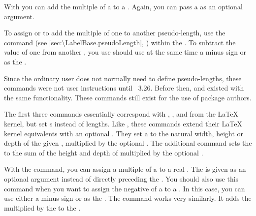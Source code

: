 With  you can add the multiple of a  to a
. Again, you can pass a  as an optional
argument.

To assign or to add the multiple of one  to another
pseudo-length, use the  command (see
\autoref{sec:\LabelBase.pseudoLength}, )
within the . To subtract the value of one 
from another , you use should use at the same time a
minus sign or  as the .

%
%
Since the ordinary user does not normally need to define pseudo-lengths, these
commands were not user instructions until \KOMAScript~3.26. Before then,
 and  existed with the
same functionality. These commands still exist for the use of package authors.%
\EndIndexGroup

\begin{Declaration}
\end{Declaration}
The first three
commands essentially correspond with ,
, and  from the \LaTeX{} kernel, but set
s instead of lengths. Like
, these commands extend their \LaTeX{}
kernel equivalents with an optional . They set a
 to the natural width, height or depth of the given
, multiplied by the optional . The additional
command  sets the  to the
sum of the height and depth of  multiplied by the optional
.%
\EndIndexGroup


\begin{Declaration}
\end{Declaration}
With the  command, you can assign a multiple of a
 to a real .  The  is given
as an optional argument instead of directly preceding the
. You should also use this command when you want to
assign the negative of a  to a . In this
case, you can use either a minus sign or  as the .
The  command works very similarly. It adds the
 multiplied by the  to the .%
%
\EndIndexGroup
%
\EndIndexGroup


